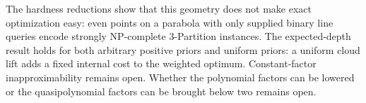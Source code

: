 The hardness reductions show that this geometry does not make exact
optimization easy: even points on a parabola with only supplied
binary line queries encode strongly NP-complete 3-Partition
instances. The expected-depth result holds for both arbitrary positive
priors and uniform priors: a uniform cloud lift adds a fixed internal
cost to the weighted optimum. Constant-factor inapproximability
remains open. Whether the polynomial factors can be lowered or
the quasipolynomial factors can be brought below two remains open.
